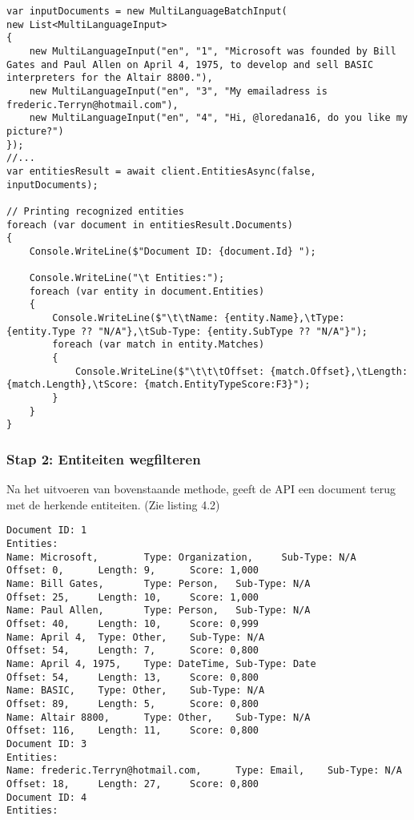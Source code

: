 \begin{lstlisting}[frame=single, caption={Een deel van de console-applicatie die de cognitive services API aanspreekt om text te ontleden in entiteiten}, captionpos=b]
var inputDocuments = new MultiLanguageBatchInput(
new List<MultiLanguageInput>
{
	new MultiLanguageInput("en", "1", "Microsoft was founded by Bill Gates and Paul Allen on April 4, 1975, to develop and sell BASIC interpreters for the Altair 8800."),
	new MultiLanguageInput("en", "3", "My emailadress is frederic.Terryn@hotmail.com"), 
	new MultiLanguageInput("en", "4", "Hi, @loredana16, do you like my picture?")
});
//...
var entitiesResult = await client.EntitiesAsync(false, inputDocuments);

// Printing recognized entities
foreach (var document in entitiesResult.Documents)
{
	Console.WriteLine($"Document ID: {document.Id} ");
	
	Console.WriteLine("\t Entities:");
	foreach (var entity in document.Entities)
	{
		Console.WriteLine($"\t\tName: {entity.Name},\tType: {entity.Type ?? "N/A"},\tSub-Type: {entity.SubType ?? "N/A"}");
		foreach (var match in entity.Matches)
		{
			Console.WriteLine($"\t\t\tOffset: {match.Offset},\tLength: {match.Length},\tScore: {match.EntityTypeScore:F3}");
		}
	}
}
\end{lstlisting}

\subsubsection{Stap 2: Entiteiten wegfilteren}

Na het uitvoeren van bovenstaande methode, geeft de API een document terug met de herkende entiteiten. (Zie listing 4.2)
\begin{lstlisting}[frame=single, caption={Resultaten in de vorm van entiteiten uit de textanalyse}, captionpos=b]
Document ID: 1
Entities:
Name: Microsoft,        Type: Organization,     Sub-Type: N/A
Offset: 0,      Length: 9,      Score: 1,000
Name: Bill Gates,       Type: Person,   Sub-Type: N/A
Offset: 25,     Length: 10,     Score: 1,000
Name: Paul Allen,       Type: Person,   Sub-Type: N/A
Offset: 40,     Length: 10,     Score: 0,999
Name: April 4,  Type: Other,    Sub-Type: N/A
Offset: 54,     Length: 7,      Score: 0,800
Name: April 4, 1975,    Type: DateTime, Sub-Type: Date
Offset: 54,     Length: 13,     Score: 0,800
Name: BASIC,    Type: Other,    Sub-Type: N/A
Offset: 89,     Length: 5,      Score: 0,800
Name: Altair 8800,      Type: Other,    Sub-Type: N/A
Offset: 116,    Length: 11,     Score: 0,800
Document ID: 3
Entities:
Name: frederic.Terryn@hotmail.com,      Type: Email,    Sub-Type: N/A
Offset: 18,     Length: 27,     Score: 0,800
Document ID: 4
Entities:
\end{lstlisting}

